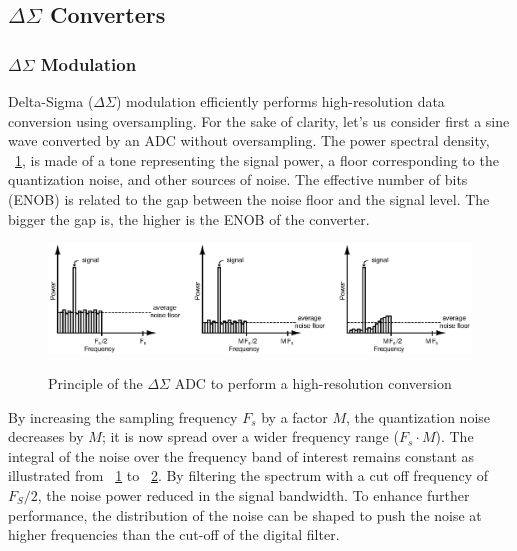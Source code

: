 \subsection{\(\Delta\Sigma \) Converters}      %
\label{sec:sd-isd-adc}
\subsubsection{\(\Delta\Sigma \) Modulation}
Delta-Sigma (\(\Delta\Sigma \)) modulation efficiently performs high-resolution data conversion using oversampling. For the sake of clarity, let's us consider first a sine wave converted by an ADC without oversampling. The power spectral density, \figurename~\ref{fig:spectrum-sine-nyquist}, is made of a tone representing the signal power, a floor corresponding to the quantization noise, and other sources of noise. The effective number of bits (ENOB) is related to the gap between the noise floor and the signal level. The bigger the gap is, the higher is the ENOB of the converter.

\begin{figure}[htp]
	\centering
	\includegraphics[width=\textwidth]{Chapter2/Figs/Vector/sd-noise-shaping.ps}
	\begin{subfigure}[b]{0.33\textwidth}
		\label{fig:spectrum-sine-nyquist}
	\end{subfigure}
	\begin{subfigure}[b]{0.33\textwidth}
		\label{fig:spectrum-sine-oversampling}
	\end{subfigure}
	\begin{subfigure}[b]{0.33\textwidth}
	\end{subfigure}
	\caption{Principle of the $\Delta \Sigma$ ADC to perform a high-resolution conversion}
	\label{}
\end{figure}

By increasing the sampling frequency $F_s$ by a factor $M$, the quantization noise decreases by $M$; it is now spread over a wider frequency range ($F_s \cdot M$). The integral of the noise over the frequency band of interest remains constant as illustrated from \figurename~\ref{fig:spectrum-sine-nyquist} to \figurename~\ref{fig:spectrum-sine-oversampling}. By filtering the spectrum with a cut off frequency of $F_S/2$, the noise power reduced in the signal bandwidth. To enhance further performance, the distribution of the noise can be shaped to push the noise at higher frequencies than the cut-off of the digital filter.

